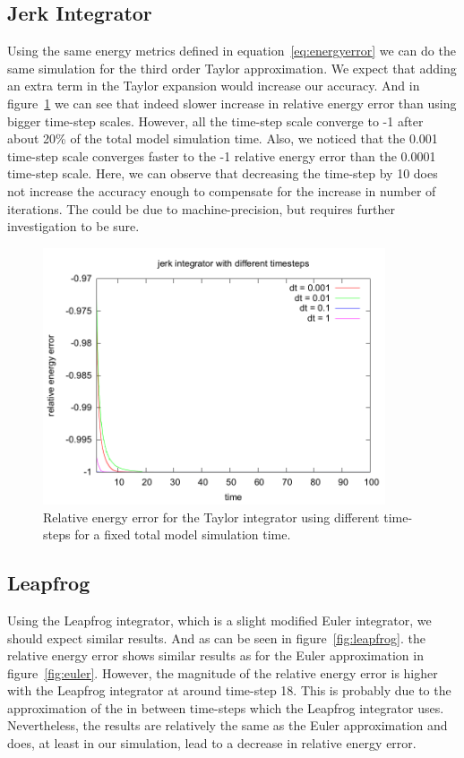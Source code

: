 \documentclass[11pt]{article} %
\begin{document}
\subsection{Jerk Integrator}
\label{sec:res:taylor}
Using the same energy metrics defined in equation~\ref{eq:energyerror} we can do the same simulation for the third order Taylor approximation. We expect that adding an extra term in the Taylor expansion would increase our accuracy. And in figure~\ref{fig:taylor} we can see that indeed slower increase in relative energy error than using bigger time-step scales. However, all the time-step scale converge to -1 after about 20\% of the total model simulation time. Also, we noticed that the 0.001 time-step scale converges faster to the -1 relative energy error than the 0.0001 time-step scale. Here, we can observe that decreasing the time-step by 10 does not increase the accuracy enough to compensate for the increase in number of iterations. The could be due to machine-precision, but requires further investigation to be sure.

\begin{figure}
    \includegraphics[width=0.9\textwidth]{jerk_different_timesteps_truncated.png}
    \caption{Relative energy error for the Taylor integrator using different time-steps for a fixed total model simulation time.}
    \label{fig:taylor}
\end{figure}

\subsection{Leapfrog}
\label{sec:res:leapfrog}
Using the Leapfrog integrator, which is a slight modified Euler integrator, we should expect similar results. And as can be seen in figure~\ref{fig:leapfrog}. the relative energy error shows similar results as for the Euler approximation in figure~\ref{fig:euler}. However, the magnitude of the relative energy error is higher with the Leapfrog integrator at around time-step 18. This is probably due to the approximation of the in between time-steps which the Leapfrog integrator uses. Nevertheless, the results are relatively the same as the Euler approximation and does, at least in our simulation, lead to a decrease in relative energy error.
\end{document}
